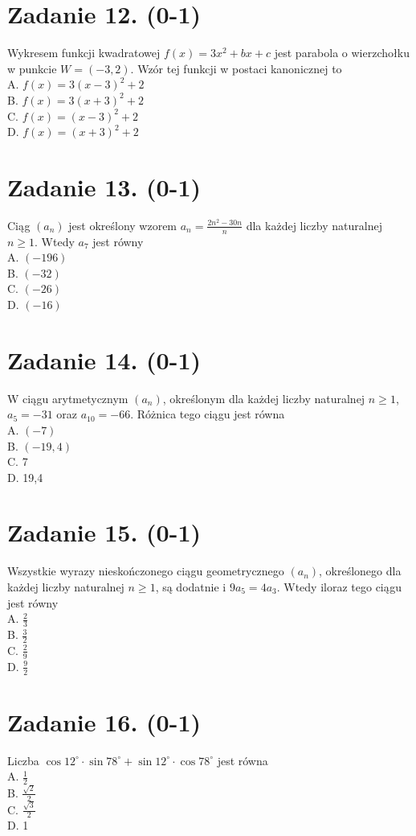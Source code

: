 \documentclass[10pt]{article}
\begin{document}
\section*{Zadanie 12. (0-1)}
Wykresem funkcji kwadratowej \(f(x)=3 x^{2}+b x+c\) jest parabola o wierzchołku w punkcie \(W=(-3,2)\). Wzór tej funkcji w postaci kanonicznej to\\
A. \(f(x)=3(x-3)^{2}+2\)\\
B. \(f(x)=3(x+3)^{2}+2\)\\
C. \(f(x)=(x-3)^{2}+2\)\\
D. \(f(x)=(x+3)^{2}+2\)

\section*{Zadanie 13. (0-1)}
Ciąg \(\left(a_{n}\right)\) jest określony wzorem \(a_{n}=\frac{2 n^{2}-30 n}{n}\) dla każdej liczby naturalnej \(n \geq 1\). Wtedy \(a_{7}\) jest równy\\
A. \((-196)\)\\
B. \((-32)\)\\
C. \((-26)\)\\
D. \((-16)\)

\section*{Zadanie 14. (0-1)}
W ciągu arytmetycznym \(\left(a_{n}\right)\), określonym dla każdej liczby naturalnej \(n \geq 1\), \(a_{5}=-31\) oraz \(a_{10}=-66\). Różnica tego ciągu jest równa\\
A. \((-7)\)\\
B. \((-19,4)\)\\
C. 7\\
D. 19,4

\section*{Zadanie 15. (0-1)}
Wszystkie wyrazy nieskończonego ciągu geometrycznego \(\left(a_{n}\right)\), określonego dla każdej liczby naturalnej \(n \geq 1\), są dodatnie i \(9 a_{5}=4 a_{3}\). Wtedy iloraz tego ciągu jest równy\\
A. \(\frac{2}{3}\)\\
B. \(\frac{3}{2}\)\\
C. \(\frac{2}{9}\)\\
D. \(\frac{9}{2}\)

\section*{Zadanie 16. (0-1)}
Liczba \(\cos 12^{\circ} \cdot \sin 78^{\circ}+\sin 12^{\circ} \cdot \cos 78^{\circ}\) jest równa\\
A. \(\frac{1}{2}\)\\
B. \(\frac{\sqrt{2}}{2}\)\\
C. \(\frac{\sqrt{3}}{2}\)\\
D. 1
\end{document}
